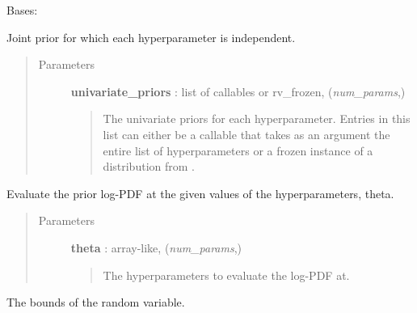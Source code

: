 \documentclass[letterpaper,10pt,english]{sphinxmanual}
\begin{document}

\begin{fulllineitems}
\label{gptools:gptools.utils.IndependentJointPrior}
Bases: {\hyperref[gptools:gptools.utils.JointPrior]{}}

Joint prior for which each hyperparameter is independent.
\begin{quote}\begin{description}
\item[{Parameters}] \leavevmode
\textbf{univariate\_priors} : list of callables or rv\_frozen, (\emph{num\_params},)
\begin{quote}

The univariate priors for each hyperparameter. Entries in this list
can either be a callable that takes as an argument the entire list of
hyperparameters or a frozen instance of a distribution from
.
\end{quote}

\end{description}\end{quote}

\begin{fulllineitems}
\label{gptools:gptools.utils.IndependentJointPrior.__call__}
Evaluate the prior log-PDF at the given values of the hyperparameters, theta.
\begin{quote}\begin{description}
\item[{Parameters}] \leavevmode
\textbf{theta} : array-like, (\emph{num\_params},)
\begin{quote}

The hyperparameters to evaluate the log-PDF at.
\end{quote}

\end{description}\end{quote}

\end{fulllineitems}


\begin{fulllineitems}
\label{gptools:gptools.utils.IndependentJointPrior.bounds}
The bounds of the random variable.


\end{fulllineitems}
\end{fulllineitems}
\end{document}
